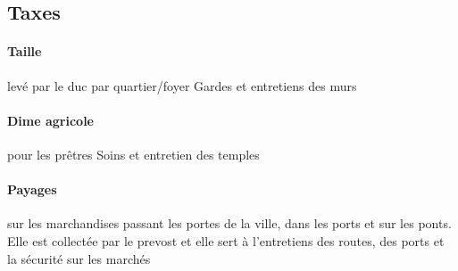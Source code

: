 \subsection{Taxes}
  \paragraph{Taille} levé par le duc par quartier/foyer
    Gardes et entretiens des murs \\
  \paragraph{Dime agricole} pour les prêtres
    Soins et entretien des temples \\
  \paragraph{Payages} sur les marchandises passant les portes de la ville, 
                      dans les ports et sur les ponts. Elle est collectée 
                      par le prevost et elle sert à
    l'entretiens des routes, des ports et la sécurité sur les marchés \\

